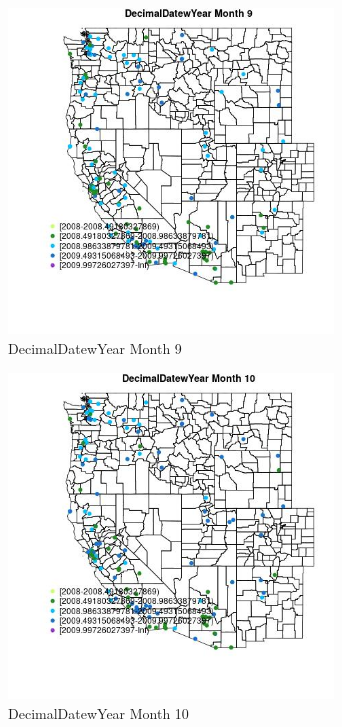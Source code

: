 \begin{figure} 
\centering  
\includegraphics[width=0.77\textwidth]{Code_Outputs/Report_ML_input_PM25_Step4_part_e_de_duplicated_aves_MapObsMo9DecimalDatewYear.jpg} 
\caption{\label{fig:Report_ML_input_PM25_Step4_part_e_de_duplicated_avesMapObsMo9DecimalDatewYear}DecimalDatewYear Month 9} 
\end{figure} 
 

\begin{figure} 
\centering  
\includegraphics[width=0.77\textwidth]{Code_Outputs/Report_ML_input_PM25_Step4_part_e_de_duplicated_aves_MapObsMo10DecimalDatewYear.jpg} 
\caption{\label{fig:Report_ML_input_PM25_Step4_part_e_de_duplicated_avesMapObsMo10DecimalDatewYear}DecimalDatewYear Month 10} 
\end{figure} 
 

